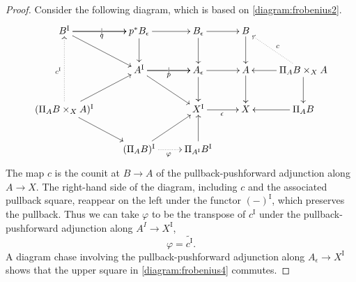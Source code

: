 \documentclass[12pt]{article}
\newcommand{\ra}{\ensuremath{\rightarrow}}
\newcommand{\I}{\ensuremath{\mathrm{I}}}
\theoremstyle{remark}
\theoremstyle{definition}
\begin{document}
\begin{proof}
Consider the following diagram, which is based on \eqref{diagram:frobenius2}.
\begin{equation}\label{diagram:frobenius7}
\xymatrix{
B^\I \ar[r]|| \ar[r]_{q} \ar[rd]  & p^*B_\epsilon \ar[r]  \ar[d]  & B_{\epsilon}  \ar[d]   \ar[r] & B \ar[d] & \\
& A^\I \ar[r]|| \ar[r]_{p}  \ar[rd]  & A_{\epsilon} \ar[d]   \ar[r] & A \ar[d]&  \ar[d]  \ar[l] \ar@{..>}[lu]_{c}\Pi_AB\times_{X} A\\
 (\Pi_AB \times_{X} A)^\I \ar@{..>}[uu]^{c^\I} \ar[ru] \ar[rd] && X^\I \ar[r]_{\epsilon} &  X &   \Pi_AB \ar[l]\\
& (\Pi_AB)^\I \ar[ru] \ar@{..>}[r]_\varphi  & \Pi_{A^\I}B^\I   \ar[u] & &
}
\end{equation}
The map $c$ is the counit at $B\ra A$ of the pullback-pushforward adjunction along $A\ra X$. The right-hand side of the diagram, including $c$ and the associated pullback square, reappear on the left under the functor $(-)^\I$, which preserves the pullback. Thus we can take $\varphi$ to be the transpose of $c^\I$ under the pullback-pushforward adjunction along $A^I\ra X^\I$,
\[
\varphi = \widetilde{c^\I}.
\]
A diagram chase involving the pullback-pushforward adjunction along $A_\epsilon\ra X^\I$ shows that the upper square in \eqref{diagram:frobenius4} commutes.

%
\smallskip


\end{proof}
\end{document}
